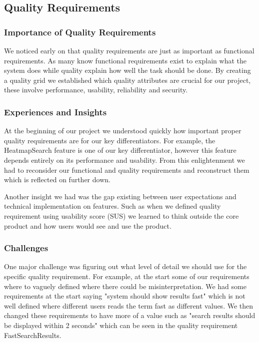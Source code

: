 \subsection{Quality Requirements}

\subsubsection{Importance of Quality Requirements}
We noticed early on that quality requirements are just as important as functional requirements. As many know functional requirements exist to explain what the system does while quality explain how well the task should be done. By creating a quality grid we established which quality attributes are crucial for our project, these involve performance, usability, reliability and security. 

\subsubsection{Experiences and Insights}
At the beginning of our project we understood quickly how important proper quality requirements are for our key differentiators. For example, the HeatmapSearch feature is one of our key differentiator, however this feature depends entirely on its performance and usability. From this enlightenment we had to reconsider our functional and quality requirements and reconstruct them which is reflected on further down. 

Another insight we had was the gap existing between user expectations and technical implementation on features. Such as when we defined quality requirement using usability score (SUS) we learned to think outside the core product and how users would see and use the product.  


\subsubsection{Challenges}
One major challenge was figuring out what level of detail we should use for the specific quality requirement. For example, at the start some of our requirements where to vaguely defined where there could be misinterpretation. We had some requirements at the start saying "system should show results fast" which is not well defined where different users reads the term fast as different values. We then changed these requirements to have more of a value such as "search results should be displayed within 2 seconds" which can be seen in the quality requirement FastSearchResults.

